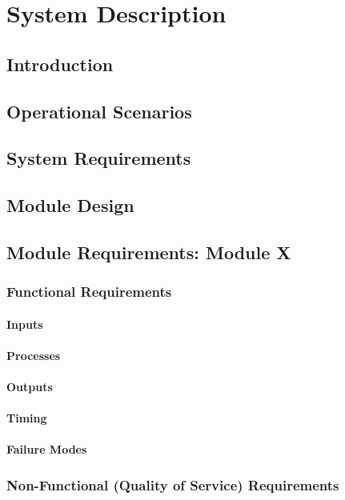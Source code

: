 \documentclass[10pt,a4paper]{report}
\begin{document}
\chapter{System Description}
\section{Introduction}

\section{Operational Scenarios}

\section{System Requirements}

\section{Module Design}

\section{Module Requirements: Module X}
\subsection{Functional Requirements}
\subsubsection{Inputs}
\subsubsection{Processes}
\subsubsection{Outputs}
\subsubsection{Timing}
\subsubsection{Failure Modes}

\subsection{Non-Functional (Quality of Service) Requirements}
\end{document}

